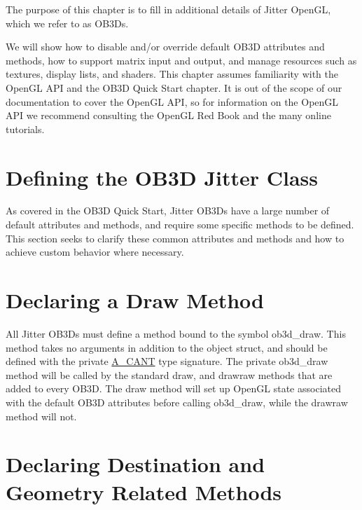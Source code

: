 The purpose of this chapter is to fill in additional details of Jitter OpenGL, which we refer to as OB3Ds.

We will show how to disable and/or override default OB3D attributes and methods, how to support matrix input and output, and manage resources such as textures, display lists, and shaders. This chapter assumes familiarity with the OpenGL API and the OB3D Quick Start chapter. It is out of the scope of our documentation to cover the OpenGL API, so for information on the OpenGL API we recommend consulting the OpenGL Red Book and the many online tutorials.\hypertarget{chapter_jit_ob3ddetails_chapter_jit_ob3ddetails_classdef}{}\section{Defining the OB3D Jitter Class}\label{chapter_jit_ob3ddetails_chapter_jit_ob3ddetails_classdef}
As covered in the OB3D Quick Start, Jitter OB3Ds have a large number of default attributes and methods, and require some specific methods to be defined. This section seeks to clarify these common attributes and methods and how to achieve custom behavior where necessary.\hypertarget{chapter_jit_ob3ddetails_chapter_jit_ob3ddetails_draw}{}\section{Declaring a Draw Method}\label{chapter_jit_ob3ddetails_chapter_jit_ob3ddetails_draw}
All Jitter OB3Ds must define a method bound to the symbol ob3d\_\-draw. This method takes no arguments in addition to the object struct, and should be defined with the private \hyperlink{group__atom_gga8aa6700e9f00b132eb376db6e39ade47af48193ec36e53b1507d81c49873c8d7a}{A\_\-CANT} type signature. The private ob3d\_\-draw method will be called by the standard draw, and drawraw methods that are added to every OB3D. The draw method will set up OpenGL state associated with the default OB3D attributes before calling ob3d\_\-draw, while the drawraw method will not.\hypertarget{chapter_jit_ob3ddetails_chapter_jit_ob3ddetails_geom}{}\section{Declaring Destination and Geometry Related Methods}\label{chapter_jit_ob3ddetails_chapter_jit_ob3ddetails_geom}
